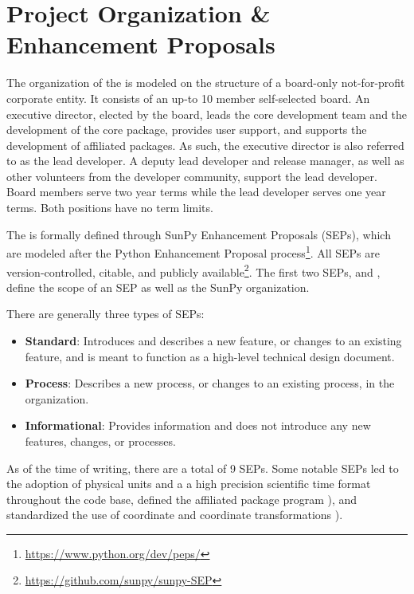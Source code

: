 \section{Project Organization \& Enhancement Proposals}
\label{sec:proj_org}

The organization of the \sunpyproj is modeled on the structure of a board-only not-for-profit corporate entity.
It consists of an up-to 10 member self-selected board.
An executive director, elected by the board, leads the core development team and the development of the \sunpypkg core package, provides user support, and supports the development of affiliated packages.
As such, the executive director is also referred to as the lead developer.
A deputy lead developer and release manager, as well as other volunteers from the developer community, support the lead developer.
Board members serve two year terms while the lead developer serves one year terms. Both positions have no term limits.

The \sunpyproj is formally defined through SunPy Enhancement Proposals (SEPs), which are modeled after the Python Enhancement Proposal process\footnote{\url{https://www.python.org/dev/peps/}}.
All SEPs are version-controlled, citable, and publicly available\footnote{\url{https://github.com/sunpy/sunpy-SEP}}.
The first two SEPs, \citet[SEP-0001]{sep-0001} and \citet[SEP-0002]{sep-0002}, define the scope of an SEP as well as the SunPy organization.

There are generally three types of SEPs:
\begin{itemize}
    \item \textbf{Standard}: Introduces and describes a new feature, or changes to an existing feature, and is meant to function as a high-level technical design document.
    \item \textbf{Process}: Describes a new process, or changes to an existing process, in the organization.
    \item \textbf{Informational}: Provides information and does not introduce any new features, changes, or processes.
\end{itemize}

As of the time of writing, there are a total of 9 SEPs.
Some notable SEPs led to the adoption of physical units \citep[SEP-0003][see Section~\ref{sec:units}]{sep-0003} and a a high precision scientific time format \citep[SEP-0008][see Section~\ref{sec:units}]{sep-0008} throughout the code base, defined the affiliated package program \citep[SEP-0004][see Section~\ref{sec:affil_package}]{sep-0004}), and standardized the use of coordinate and coordinate transformations \citep[SEP-0005][see Section~\ref{sec:coords}]{sep-0005}).
